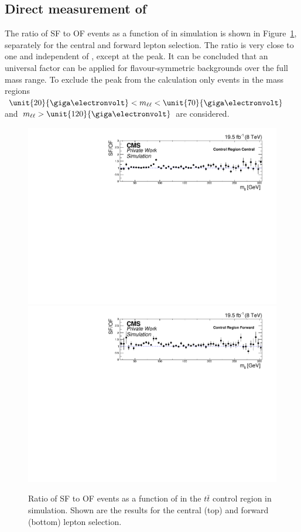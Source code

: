 \subsection{Direct measurement of \Rsfof}
The ratio of SF to OF events as a function of \mll in simulation is shown in Figure~\ref{fig:controlRatioMC}, separately for the central and forward lepton selection. The ratio is very close to one and independent of \mll, except at the \Z peak. It can be concluded that an universal factor can be applied for flavour-symmetric backgrounds over the full mass range. To exclude the \Z peak from the calculation only events in the mass regions $\unit{20}{\giga\electronvolt}< \mll < \unit{70}{\giga\electronvolt}$ and $\mll > \unit{120}{\giga\electronvolt}$ are considered.   	
\begin{figure}
\begin{center}
\includegraphics[scale=0.4]{plots/BG/control/rSFOF_ControlCentral_Full2012_Mll_None_MC.pdf}\\
\includegraphics[scale=0.4]{plots/BG/control/rSFOF_ControlForward_Full2012_Mll_None_MC.pdf}
\caption{Ratio of SF to OF events as a function of \mll in the $t\bar{t}$ control region in simulation. Shown are the results for the central (top) and forward (bottom) lepton selection.}
\label{fig:controlRatioMC}
\end{center}
\end{figure}
